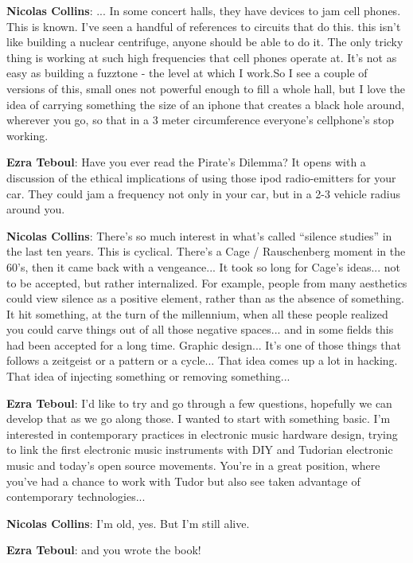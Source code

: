\textbf{Nicolas Collins}: ... In some concert halls, they have devices to jam cell phones. This is known. I’ve seen a handful of references to circuits that do this. this isn’t like building a nuclear centrifuge, anyone should be able to do it. The only tricky thing is working at such high frequencies that cell phones operate at. It’s not as easy as building a fuzztone - the level at which I work.So I see a couple of versions of this, small ones not powerful enough to fill a whole hall, but I love the idea of carrying something the size of an iphone that creates a black hole around, wherever you go, so that in a 3 meter circumference everyone’s cellphone’s stop working.		
					
\textbf{Ezra Teboul}: Have you ever read the Pirate’s Dilemma? It opens with a discussion of the ethical implications of using those ipod radio-emitters for your car. They could jam a frequency not only in your car, but in a 2-3 vehicle radius around you.
					
\textbf{Nicolas Collins}: There’s so much interest in what’s called ``silence studies'' in the last ten years. This is cyclical. There’s a Cage / Rauschenberg moment in the 60’s, then it came back with a vengeance... It took so long for Cage’s ideas... not to be accepted, but rather internalized. For example, people from many aesthetics could view silence as a positive element, rather than as the absence of something. It hit something, at the turn of the millennium, when all these people realized you could carve things out of all those negative spaces... and in some fields this had been accepted for a long time. Graphic design... It’s one of those things that follows a zeitgeist or a pattern or a cycle... That idea comes up a lot in hacking. That idea of injecting something or removing something...
					
\textbf{Ezra Teboul}: I’d like to try and go through a few questions, hopefully we can develop that as we go along those. I wanted to start with something basic. I’m interested in contemporary practices in electronic music hardware design, trying to link the first electronic music instruments with DIY and Tudorian electronic music and today’s open source movements. You’re in a great position, where you’ve had a chance to work with Tudor but also see taken advantage of contemporary technologies...
					
\textbf{Nicolas Collins}: I’m old, yes. But I’m still alive.

\textbf{Ezra Teboul}: and you wrote the book!

